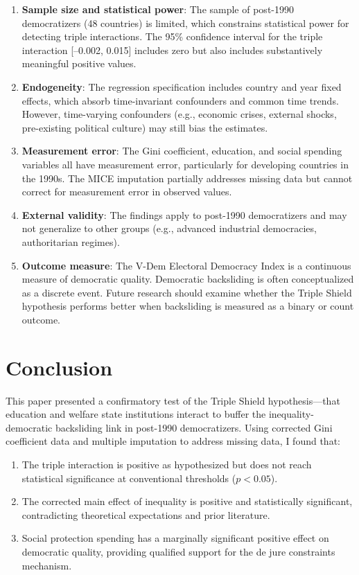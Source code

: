 \documentclass[11pt,letterpaper]{article}
\begin{document}
\begin{enumerate}
    \item \textbf{Sample size and statistical power}: The sample of post-1990 democratizers (48 countries) is limited, which constrains statistical power for detecting triple interactions. The 95\% confidence interval for the triple interaction [--0.002, 0.015] includes zero but also includes substantively meaningful positive values.
    
    \item \textbf{Endogeneity}: The regression specification includes country and year fixed effects, which absorb time-invariant confounders and common time trends. However, time-varying confounders (e.g., economic crises, external shocks, pre-existing political culture) may still bias the estimates.
    
    \item \textbf{Measurement error}: The Gini coefficient, education, and social spending variables all have measurement error, particularly for developing countries in the 1990s. The MICE imputation partially addresses missing data but cannot correct for measurement error in observed values.
    
    \item \textbf{External validity}: The findings apply to post-1990 democratizers and may not generalize to other groups (e.g., advanced industrial democracies, authoritarian regimes).
    
    \item \textbf{Outcome measure}: The V-Dem Electoral Democracy Index is a continuous measure of democratic quality. Democratic backsliding is often conceptualized as a discrete event. Future research should examine whether the Triple Shield hypothesis performs better when backsliding is measured as a binary or count outcome.
\end{enumerate}

\section{Conclusion}

This paper presented a confirmatory test of the Triple Shield hypothesis---that education and welfare state institutions interact to buffer the inequality-democratic backsliding link in post-1990 democratizers. Using corrected Gini coefficient data and multiple imputation to address missing data, I found that:

\begin{enumerate}
    \item The triple interaction is positive as hypothesized but does not reach statistical significance at conventional thresholds ($p < 0.05$).
    
    \item The corrected main effect of inequality is positive and statistically significant, contradicting theoretical expectations and prior literature.
    
    \item Social protection spending has a marginally significant positive effect on democratic quality, providing qualified support for the de jure constraints mechanism.
\end{enumerate}
\end{document}
